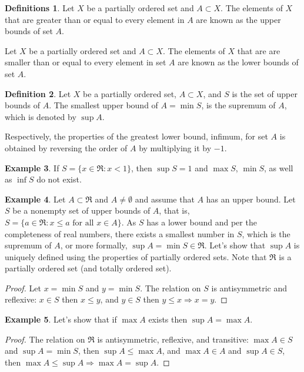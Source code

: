 \documentclass[12pt,a4paper]{article}
\theoremstyle{definition}
\newtheorem{defn}{Definition}[section]
\newtheorem{defns}[defn]{Definitions}
\newtheorem{example}[defn]{Example}
\begin{document}
\begin{defns}
Let $X$ be a partially ordered set and $A \subset X$. The elements of $X$ that
are greater than or equal to every element in $A$ are known as the upper bounds
of set $A$.

Let $X$ be a partially ordered set and $A \subset X$. The elements of $X$ that
are are smaller than or equal to every element in set $A$ are known as the
lower bounds of set $A$. 
\end{defns}

\begin{defn}
Let $X$ be a partially ordered set, $A \subset X$, and $S$ is the set of upper
bounds of $A$. The smallest upper bound of $A = \min S$, is the supremum of
$A$, which is denoted by $\sup A$.
\end{defn}

Respectively, the properties of the greatest lower bound, infimum, for set $A$
is obtained by reversing the order of $A$ by multiplying it by $-1$.

\begin{example}
If $S = \{ x \in \Re : x < 1 \}$, then $\sup S = 1$ and $\max S$, $\min S$, as
well as $\inf S$ do not exist.
\end{example}

\begin{example}
Let $A \subset \Re$ and $A \neq \emptyset$ and assume that $A$ has an upper
bound. Let $S$ be a nonempty set of upper bounds of $A$, that is, $S = \{ a \in
\Re : x \leq a \text{ for all } x \in A \}$. As $S$ has a lower bound and per
the completeness of real numbers, there exists a smallest number in $S$, which
is the supremum of $A$, or more formally, $\sup A = \min S \in \Re$.  Let's
show that $\sup A$ is uniquely defined using the properties of partially
ordered sets. Note that $\Re$ is a partially ordered set (and totally ordered
set).
\begin{proof}
Let $x = \min S$ and $y = \min S$. The relation on $S$ is antisymmetric and
reflexive: $x \in S$ then $x \leq y$, and $y \in S$ then $y \leq x \Rightarrow
x = y$.
\end{proof}
\end{example}

\begin{example}
Let's show that if $\max A$ exists then $\sup A = \max A$.
\begin{proof}
The relation on $\Re$ is antisymmetric, reflexive, and transitive: $\max A \in
S$ and $\sup A = \min S$, then $\sup A \leq \max A$, and $\max A \in A$ and
$\sup A \in S$, then $\max A \leq \sup A \Rightarrow \max A = \sup A$.
\end{proof}
\end{example}
\end{document}
